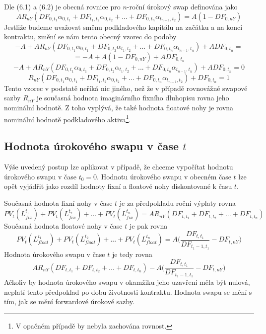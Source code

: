 \documentclass[a4paper]{book}
\begin{document}
Dle (6.1) a (6.2) je obecná rovnice pro $n$-roční úrokový swap definována jako
\begin{equation*}
AR_{nY}(DF_{0,t_1} \alpha_{0,t_1} + DF_{t_1, t_2} \alpha_{0,t_2} + ... + DF_{0, t_n} \alpha_{t_{n-1},t_2}) = A(1 - DF_{0,nY})
\end{equation*}
Jestliže budeme uvažovat směnu podkladového kapitálu na začátku a na konci kontraktu, změní se nám tento obecný vzorec do podoby
\begin{equation*}
-A + AR_{nY}(DF_{0,t_1} \alpha_{0,t_1} + DF_{0, t_2} \alpha_{t_1,t_2} + ... + DF_{0, t_n} \alpha_{t_{n-1},t_n}) + A DF_{0, t_n} =
\end{equation*}
\begin{equation*}
= -A + A(1 - DF_{0,nY}) + A DF_{0, t_n}
\end{equation*}
\begin{equation*}
-A + AR_{nY}(DF_{0,t_1} \alpha_{0,t_1} + DF_{0, t_2} \alpha_{t_1,t_2} + ... + DF_{0, t_n} \alpha_{t_{n-1},t_n}) + A DF_{0, t_n} = 0
\end{equation*}
\begin{equation*}
R_{nY}(DF_{0,t_1} \alpha_{0,t_1} + DF_{t_1, t_2} \alpha_{0,t_2} + ... + DF_{0, t_n} \alpha_{t_{n-1},t_2}) + DF_{0, t_n} = 1
\end{equation*}
Tento vzorec v podstatě neříká nic jiného, než že v případě rovnovážné swapové sazby $R_{nY}$ je současná hodnota imaginárního fixního dluhopisu rovna jeho nominální hodnotě. Z toho vyplývá, že také hodnota floatové nohy je rovna nominální hodnotě podkladového aktiva\footnote{V opačném případě by nebyla zachována rovnost.}. 

\subsection{Hodnota úrokového swapu v čase $t$}

Výše uvedený postup lze aplikovat v případě, že chceme vypočítat hodnotu úrokového swapu v čase $t_0 = 0$. Hodnotu úrokového swapu v obecném čase $t$ lze opět vyjádřit jako rozdíl hodnoty fixní a floatové nohy diskontované k času $t$.

Současná hodnota fixní nohy v čase $t$ je za předpokladu roční výplaty rovna
\begin{equation*}
PV_t(L_{fix}^{t_1}) + PV_t(L_{fix}^{t_2}) + ... + PV_t(L_{fix}^{t_n}) = A R_{nY}(DF_{t, t_1} + DF_{t, t_2} + ... + DF_{t, t_n})
\end{equation*}
Současná hodnota floatové nohy v čase $t$ je pak rovna
\begin{equation*}
PV_t(L_{float}^{t_1}) + PV_t(L_{float}^{t_2}) + ... + PV_t(L_{float}^{t_n}) = A \bigg(\frac{DF_{t,t_1}}{DF_{t_1 - 1, t_1}} - DF_{t, nY} \bigg)
\end{equation*}
Hodnota úrokového swapu v čase $t$ je tedy rovna
\begin{equation*}
A R_{nY}(DF_{t, t_1} + DF_{t, t_2} + ... + DF_{t, t_n}) - A \bigg(\frac{DF_{t,t_1}}{DF_{t_1 - 1, t_1}} - DF_{t, nY} \bigg)
\end{equation*}
Ačkoliv by hodnota úrokového swapu v okamžiku jeho uzavření měla být nulová, neplatí tento předpoklad po dobu životnosti kontraktu. Hodnota swapu se mění s tím, jak se mění forwardové úrokové sazby.
\end{document}
